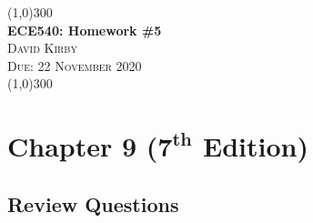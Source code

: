 \documentclass[12pt]{article}
\begin{document}
 	\begin{center}
    \line(1,0){300}\\[0.25cm]
 	\Large{\bfseries ECE540: Homework \#5}\\
 	\textsc{\large David Kirby}\\
 	\textsc{\large Due: 22 November 2020}\\
 	\line(1,0){300}\\[0.75cm]
 	\end{center}
\section*{Chapter 9 (\(\bm{7^{th}}\) Edition)}
\subsection*{Review Questions}
\end{document}
